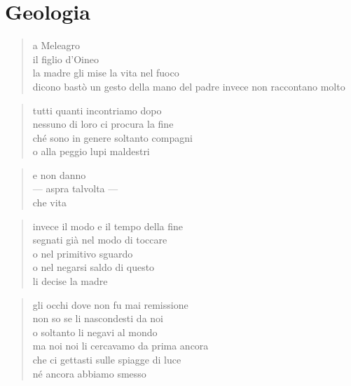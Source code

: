 \chapter*{Geologia}


\begin{verse}
    a Meleagro\\
    il figlio d'Oineo\\
    la madre gli mise la vita nel fuoco\\
    dicono bastò un gesto della mano
    del padre invece non raccontano molto
\end{verse}

\clearpage


\begin{verse}
    tutti quanti incontriamo dopo\\
    nessuno di loro ci procura la fine\\
    ché sono in genere soltanto compagni\\
    o alla peggio lupi maldestri
\end{verse}

\begin{verse}
    e non danno\\
    — aspra talvolta —\\
    che vita
\end{verse}

\begin{verse}
    invece il modo e il tempo della fine\\
    segnati già nel modo di toccare\\
    o nel primitivo sguardo\\
    o nel negarsi saldo di questo\\
    li decise la madre
\end{verse}

\clearpage


\begin{verse}
    gli occhi dove non fu mai remissione\\
    non so se li nascondesti da noi\\
    o soltanto li negavi al mondo\\
    ma noi noi li cercavamo da prima ancora\\
    che ci gettasti sulle spiagge di luce\\
    né ancora abbiamo smesso
\end{verse}


